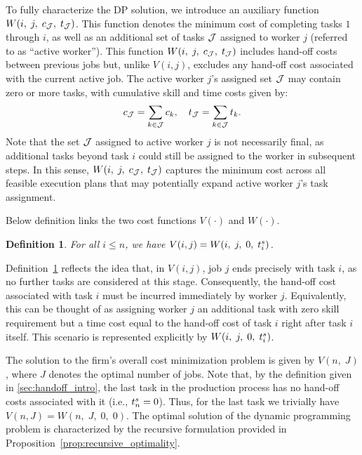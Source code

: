 \documentclass{article}
\theoremstyle{plain}
\theoremstyle{plain}
\newtheorem{definition}[theorem]{Definition}
\begin{document}
To fully characterize the DP solution, we introduce an auxiliary function $W(i,\; j,\; c_{\mathcal{J}},\; t_{\mathcal{J}})$.
This function denotes the minimum cost of completing tasks $1$ through $i$, as well as an additional set of tasks $\mathcal{J}$ assigned to worker $j$ (referred to as ``active worker''). 
This function $W(i,\; j,\; c_{\mathcal{J}},\; t_{\mathcal{J}})$ includes hand-off costs between previous jobs but, unlike $V(i,j)$, excludes any hand-off cost associated with the current active job.
The active worker $j$'s assigned set $\mathcal{J}$ may contain zero or more tasks, with cumulative skill and time costs given by:
\[
c_{\mathcal{J}} = \sum_{k \in \mathcal{J}} c_{k}, 
\quad
t_{\mathcal{J}} = \sum_{k \in \mathcal{J}} t_{k}.
\]
Note that the set $\mathcal{J}$ assigned to active worker $j$ is not necessarily final, as additional tasks beyond task $i$ could still be assigned to the worker in subsequent steps.
In this sense, $W(i,\; j,\; c_{\mathcal{J}},\; t_{\mathcal{J}})$ captures the minimum cost across all feasible execution plans that may potentially expand active worker $j$'s task assignment.

Below definition links the two cost functions $V(\cdot)$ and $W(\cdot)$.
\begin{definition}
\label{def:V_W}
For all $i \leq n$, we have $V(i,j) = W(i,\; j,\; 0,\; t^{s}_{i})$.
\end{definition}
Definition~\ref{def:V_W} reflects the idea that, in $V(i,j)$, job $j$ ends precisely with task $i$, as no further tasks are considered at this stage.
Consequently, the hand-off cost associated with task $i$ must be incurred immediately by worker $j$.
Equivalently, this can be thought of as assigning worker $j$ an additional task with zero skill requirement but a time cost equal to the hand-off cost of task $i$ right after task $i$ itself.
This scenario is represented explicitly by $W(i,\; j,\; 0,\; t^{s}_{i})$.

The solution to the firm's overall cost minimization problem is given by $V(n,\; J)$, where $J$ denotes the optimal number of jobs.
Note that, by the definition given in \ref{sec:handoff_intro}, the last task in the production process has no hand-off costs associated with it (i.e., $t^{s}_{n} = 0$).
Thus, for the last task we trivially have $V(n, J) = W(n,\; J,\; 0,\; 0)$.
The optimal solution of the dynamic programming problem is characterized by the recursive formulation provided in Proposition~\ref{prop:recursive_optimality}.
\end{document}
